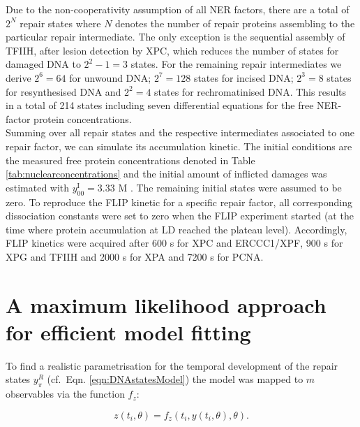Due to the non-cooperativity assumption of all NER factors, there are a total of $2^N$ repair states where $N$ denotes the number of repair proteins assembling to the particular repair intermediate. The only exception is the sequential assembly of TFIIH, after lesion detection by XPC, which reduces the number of states for damaged DNA to $ 2^2-1 = 3$ states. For the remaining repair intermediates we derive  $ 2^6 = 64$ for unwound DNA; $ 2^7 = 128$ states for incised DNA; $ 2^3 = 8$ states for resynthesised DNA and $ 2^2 = 4$ states for rechromatinised DNA. This results in a total of 214 states including seven differential equations for the free NER-factor protein concentrations. \\
Summing over all repair states and the respective intermediates associated to one repair factor, we can simulate its accumulation kinetic. The initial conditions are the measured free protein concentrations denoted in Table \ref{tab:nuclearconcentrations}\cite{Terstiege2010,Luijsterburg2010} and the initial amount of inflicted damages was estimated with  $y_{00}^{\text{I}} = 3.33$ \textmu M \cite{Verbruggen2014}. The remaining initial states were assumed to be zero. To reproduce the FLIP kinetic for a specific repair factor, all corresponding dissociation constants were set to zero when the FLIP experiment started (at the time where protein accumulation at LD reached the plateau level). Accordingly, FLIP kinetics were acquired after 600 s for XPC and ERCCC1/XPF, 900 s for XPG and TFIIH and 2000 s for XPA and 7200 s for PCNA. 


 

\section{A maximum likelihood approach for efficient model fitting}
\label{sec:maximumLL}
To find a realistic parametrisation for the temporal development of the repair states $y_\pi^R$ (cf.\ Eqn. \ref{eqn:DNAstatesModel}) the model was mapped to $m$ observables via the function $f_z$:

  \begin{equation}
  	z(t_i,\theta) = f_z(t_i,y(t_i,\theta),\theta).
  	\label{eqn:observable}
  \end{equation} 

